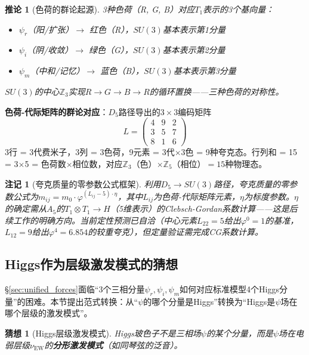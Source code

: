 \documentclass[12pt,a4paper,twocolumn]{article}
\renewcommand{\phi}{\varphi}
\newtheorem{corollary}[theorem]{推论}
\newtheorem{remark}[theorem]{注记}
\newtheorem{conjecture}[theorem]{猜想}
\begin{document}
\begin{corollary}[色荷的群论起源]
\label{cor:color_origin}
3种色荷（R, G, B）对应$T_1$表示的3个基向量：
\begin{itemize}
\item $\psi_r$（阳/扩张）$\to$ 红色（R），$SU(3)$基本表示第1分量
\item $\psi_i$（阴/收敛）$\to$ 绿色（G），$SU(3)$基本表示第2分量
\item $\psi_m$（中和/记忆）$\to$ 蓝色（B），$SU(3)$基本表示第3分量
\end{itemize}
$SU(3)$的中心$\mathbb{Z}_3$实现$R \to G \to B \to R$的循环置换——三种色荷的对称性。
\end{corollary}

\textbf{色荷-代际矩阵的群论对应}：$D_5$路径导出的$3\times3$编码矩阵
\[
L = \begin{pmatrix} 4 & 9 & 2 \\ 3 & 5 & 7 \\ 8 & 1 & 6 \end{pmatrix}
\]
3行 = 3代费米子，3列 = 3色荷，9元素 = 3代$\times$3色 = 9种夸克态。行列和 = 15 = 3$\times$5 = 色荷数$\times$相位数，对应$\mathbb{Z}_3$（色）$\times \mathbb{Z}_5$（相位）$= 15$种物理态。

\begin{remark}[夸克质量的零参数公式框架]
\label{rmk:quark_mass_framework}
利用$D_5 \to SU(3)$路径，夸克质量的零参数公式为$m_{ij} = m_0 \cdot \phi^{(L_{ij} - 5)\cdot\eta}$，其中$L_{ij}$为色荷-代际矩阵元素，$\eta$为标度参数。$\eta$的确定需从$A_5$的$T_1 \otimes T_1 \to H$（5维表示）的Clebsch-Gordan系数计算——这是后续工作的明确方向。当前定性预测已自洽（中心元素$L_{22}=5$给出$\phi^0=1$的基准，$L_{12}=9$给出$\phi^4=6.854$的较重夸克），但定量验证需完成CG系数计算。
\end{remark}

\subsection{Higgs作为层级激发模式的猜想}
\label{subsec:higgs_excitation}

§\ref{sec:unified_forces}面临``3个三相分量$\psi_r, \psi_i, \psi_m$如何对应标准模型4个Higgs分量''的困难。本节提出范式转换：从``$\psi$的哪个分量是Higgs''转换为``Higgs是$\psi$场在哪个层级的激发模式''。

\begin{conjecture}[Higgs层级激发模式]
\label{conj:higgs_excitation}
Higgs玻色子不是三相场$\psi$的某个分量，而是$\psi$场在电弱层级$\nu_{\text{EW}}$的\textbf{分形激发模式}（如同琴弦的泛音）。
\end{conjecture}
\end{document}
